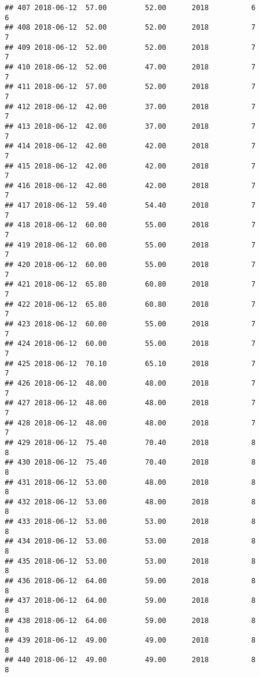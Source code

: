 \documentclass[]{article}
\begin{document}
\begin{verbatim}
## 407 2018-06-12  57.00         52.00      2018          6                 6
## 408 2018-06-12  52.00         52.00      2018          7                 7
## 409 2018-06-12  52.00         52.00      2018          7                 7
## 410 2018-06-12  52.00         47.00      2018          7                 7
## 411 2018-06-12  57.00         52.00      2018          7                 7
## 412 2018-06-12  42.00         37.00      2018          7                 7
## 413 2018-06-12  42.00         37.00      2018          7                 7
## 414 2018-06-12  42.00         42.00      2018          7                 7
## 415 2018-06-12  42.00         42.00      2018          7                 7
## 416 2018-06-12  42.00         42.00      2018          7                 7
## 417 2018-06-12  59.40         54.40      2018          7                 7
## 418 2018-06-12  60.00         55.00      2018          7                 7
## 419 2018-06-12  60.00         55.00      2018          7                 7
## 420 2018-06-12  60.00         55.00      2018          7                 7
## 421 2018-06-12  65.80         60.80      2018          7                 7
## 422 2018-06-12  65.80         60.80      2018          7                 7
## 423 2018-06-12  60.00         55.00      2018          7                 7
## 424 2018-06-12  60.00         55.00      2018          7                 7
## 425 2018-06-12  70.10         65.10      2018          7                 7
## 426 2018-06-12  48.00         48.00      2018          7                 7
## 427 2018-06-12  48.00         48.00      2018          7                 7
## 428 2018-06-12  48.00         48.00      2018          7                 7
## 429 2018-06-12  75.40         70.40      2018          8                 8
## 430 2018-06-12  75.40         70.40      2018          8                 8
## 431 2018-06-12  53.00         48.00      2018          8                 8
## 432 2018-06-12  53.00         48.00      2018          8                 8
## 433 2018-06-12  53.00         53.00      2018          8                 8
## 434 2018-06-12  53.00         53.00      2018          8                 8
## 435 2018-06-12  53.00         53.00      2018          8                 8
## 436 2018-06-12  64.00         59.00      2018          8                 8
## 437 2018-06-12  64.00         59.00      2018          8                 8
## 438 2018-06-12  64.00         59.00      2018          8                 8
## 439 2018-06-12  49.00         49.00      2018          8                 8
## 440 2018-06-12  49.00         49.00      2018          8                 8

\end{verbatim}
\end{document}
